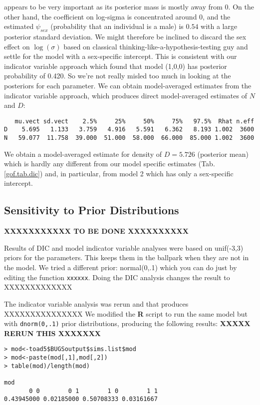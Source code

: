 appears to be very important as its posterior mass is mostly away from 0.
On the other hand,  the
coefficient on log-sigma is  concentrated around 0, and the estimated
$\psi_{sex}$ (probability that an individual is a male) is $0.54$ with
a large posterior standard deviation.
 We might therefore be inclined to
discard the sex effect on $\log(\sigma)$ based 
on classical thinking-like-a-hypothesis-testing guy and settle for the
model with a sex-specific intercept. This is consistent with our
indicator variable approach which found that model (1,0,0)
has posterior 
probability  of 0.420. So we're not really
misled too much in looking at the posteriors for each parameter.
We can obtain model-averaged estimates from the indicator variable
approach, which 
 produces direct model-averaged estimates of $N$ and $D$: 
{\small
\begin{verbatim}
   mu.vect sd.vect    2.5%     25%     50%     75%   97.5%  Rhat n.eff
D    5.695   1.133   3.759   4.916   5.591   6.362   8.193 1.002  3600
N   59.077  11.758  39.000  51.000  58.000  66.000  85.000 1.002  3600
\end{verbatim}
}
We obtain a model-averaged estimate for density of $D=5.726$
(posterior mean) which is hardly any different from our
model specific estimates (Tab. \ref{gof.tab.dic}) and, in particular, from model 2
which has only a sex-specific intercept. 



\subsection{Sensitivity to Prior Distributions}

{\bf XXXXXXXXXXX TO BE DONE XXXXXXXXXX}

Results of DIC and model indicator variable analyses were based on 
unif(-3,3) priors for the parameters. This keeps them in the ballpark
when they are not in the model. We tried a different prior:
normal(0,.1) which you can do just by editing the function \mbox{\tt xxxxxx}.
Doing the DIC analysis changes the result to XXXXXXXXXXXXX

The indicator variable analysis was rerun and that produces XXXXXXXXXXXXXXX
We modified
 the {\bf R} script to run the same model
but with \mbox{\tt dnorm(0,.1)} prior distributions, producing the
following results:  {\bf XXXXX RERUN THIS XXXXXXX}
\begin{verbatim}
> mod<-toad5$BUGSoutput$sims.list$mod
> mod<-paste(mod[,1],mod[,2])
> table(mod)/length(mod)

mod
       0 0        0 1        1 0        1 1
0.43945000 0.02185000 0.50708333 0.03161667
\end{verbatim}


